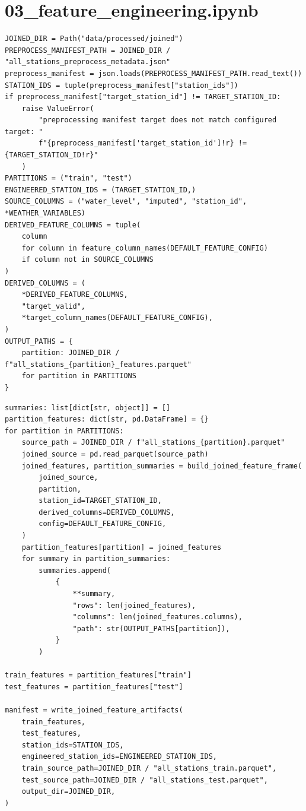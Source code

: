 \section{03\_feature\_engineering.ipynb}

\begin{verbatim}
JOINED_DIR = Path("data/processed/joined")
PREPROCESS_MANIFEST_PATH = JOINED_DIR / "all_stations_preprocess_metadata.json"
preprocess_manifest = json.loads(PREPROCESS_MANIFEST_PATH.read_text())
STATION_IDS = tuple(preprocess_manifest["station_ids"])
if preprocess_manifest["target_station_id"] != TARGET_STATION_ID:
    raise ValueError(
        "preprocessing manifest target does not match configured target: "
        f"{preprocess_manifest['target_station_id']!r} != {TARGET_STATION_ID!r}"
    )
PARTITIONS = ("train", "test")
ENGINEERED_STATION_IDS = (TARGET_STATION_ID,)
SOURCE_COLUMNS = ("water_level", "imputed", "station_id", *WEATHER_VARIABLES)
DERIVED_FEATURE_COLUMNS = tuple(
    column
    for column in feature_column_names(DEFAULT_FEATURE_CONFIG)
    if column not in SOURCE_COLUMNS
)
DERIVED_COLUMNS = (
    *DERIVED_FEATURE_COLUMNS,
    "target_valid",
    *target_column_names(DEFAULT_FEATURE_CONFIG),
)
OUTPUT_PATHS = {
    partition: JOINED_DIR / f"all_stations_{partition}_features.parquet"
    for partition in PARTITIONS
}
\end{verbatim}

\begin{verbatim}
summaries: list[dict[str, object]] = []
partition_features: dict[str, pd.DataFrame] = {}
for partition in PARTITIONS:
    source_path = JOINED_DIR / f"all_stations_{partition}.parquet"
    joined_source = pd.read_parquet(source_path)
    joined_features, partition_summaries = build_joined_feature_frame(
        joined_source,
        partition,
        station_id=TARGET_STATION_ID,
        derived_columns=DERIVED_COLUMNS,
        config=DEFAULT_FEATURE_CONFIG,
    )
    partition_features[partition] = joined_features
    for summary in partition_summaries:
        summaries.append(
            {
                **summary,
                "rows": len(joined_features),
                "columns": len(joined_features.columns),
                "path": str(OUTPUT_PATHS[partition]),
            }
        )

train_features = partition_features["train"]
test_features = partition_features["test"]

manifest = write_joined_feature_artifacts(
    train_features,
    test_features,
    station_ids=STATION_IDS,
    engineered_station_ids=ENGINEERED_STATION_IDS,
    train_source_path=JOINED_DIR / "all_stations_train.parquet",
    test_source_path=JOINED_DIR / "all_stations_test.parquet",
    output_dir=JOINED_DIR,
)
\end{verbatim}

